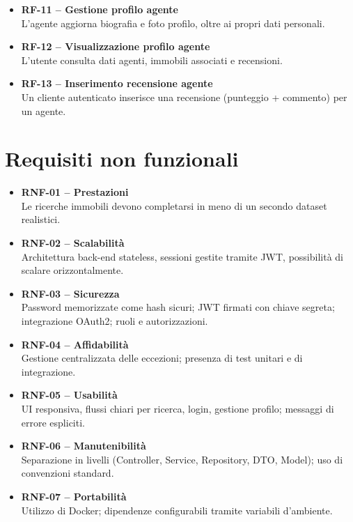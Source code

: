 \documentclass[a4paper,11pt]{report}
\begin{document}
\begin{itemize}[nosep]
  \item \textbf{RF-11 -- Gestione profilo agente}\\
  L’agente aggiorna biografia e foto profilo, oltre ai propri dati personali.

  \item \textbf{RF-12 -- Visualizzazione profilo agente}\\
  L’utente consulta dati agenti, immobili associati e recensioni.

  \item \textbf{RF-13 -- Inserimento recensione agente}\\
  Un cliente autenticato inserisce una recensione (punteggio + commento) per un agente.

\end{itemize}

\section{Requisiti non funzionali}

\begin{itemize}[nosep]
  \item \textbf{RNF-01 -- Prestazioni}\\
  Le ricerche immobili devono completarsi in meno di un secondo dataset realistici.

  \item \textbf{RNF-02 -- Scalabilità}\\
  Architettura back-end stateless, sessioni gestite tramite JWT, possibilità di scalare orizzontalmente.

  \item \textbf{RNF-03 -- Sicurezza}\\
  Password memorizzate come hash sicuri; JWT firmati con chiave segreta; integrazione OAuth2; ruoli e autorizzazioni.

  \item \textbf{RNF-04 -- Affidabilità}\\
  Gestione centralizzata delle eccezioni; presenza di test unitari e di integrazione.

  \item \textbf{RNF-05 -- Usabilità}\\
  UI responsiva, flussi chiari per ricerca, login, gestione profilo; messaggi di errore espliciti.

  \item \textbf{RNF-06 -- Manutenibilità}\\
  Separazione in livelli (Controller, Service, Repository, DTO, Model); uso di convenzioni standard.

  \item \textbf{RNF-07 -- Portabilità}\\
  Utilizzo di Docker; dipendenze configurabili tramite variabili d’ambiente.
\end{itemize}
\end{document}
